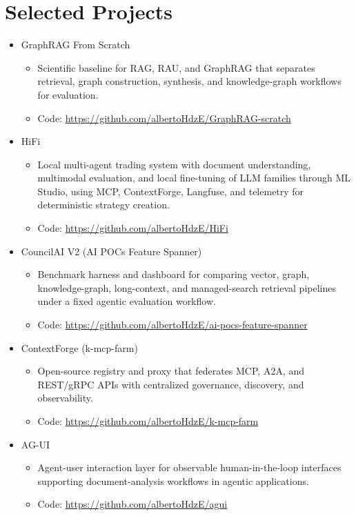 \documentclass{article}
\begin{document}
\section{Selected Projects}
\begin{itemize}
\item \hypertarget{proj-graphrag}{}GraphRAG From Scratch
\begin{itemize}
\item Scientific baseline for RAG, RAU, and GraphRAG that separates retrieval, graph construction, synthesis, and knowledge-graph workflows for evaluation.
\item Code: \url{https://github.com/albertoHdzE/GraphRAG-scratch}
\end{itemize}

\item \hypertarget{proj-hifi}{}HiFi
\begin{itemize}
\item Local multi-agent trading system with document understanding, multimodal evaluation, and local fine-tuning of LLM families through ML Studio, using MCP, ContextForge, Langfuse, and telemetry for deterministic strategy creation.
\item Code: \url{https://github.com/albertoHdzE/HiFi}
\end{itemize}

\item \hypertarget{proj-councilai}{}CouncilAI V2 (AI POCs Feature Spanner)
\begin{itemize}
\item Benchmark harness and dashboard for comparing vector, graph, knowledge-graph, long-context, and managed-search retrieval pipelines under a fixed agentic evaluation workflow.
\item Code: \url{https://github.com/albertoHdzE/ai-pocs-feature-spanner}
\end{itemize}

\item \hypertarget{proj-contextforge}{}ContextForge (k-mcp-farm)
\begin{itemize}
\item Open-source registry and proxy that federates MCP, A2A, and REST/gRPC APIs with centralized governance, discovery, and observability.
\item Code: \url{https://github.com/albertoHdzE/k-mcp-farm}
\end{itemize}

\item \hypertarget{proj-agui}{}AG-UI
\begin{itemize}
\item Agent-user interaction layer for observable human-in-the-loop interfaces supporting document-analysis workflows in agentic applications.
\item Code: \url{https://github.com/albertoHdzE/agui}
\end{itemize}


\end{itemize}
\end{document}
